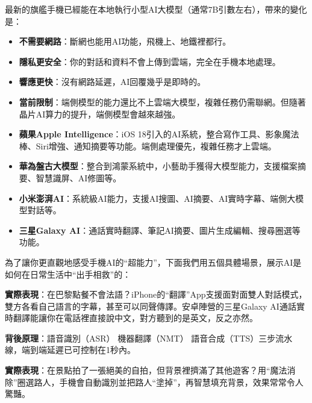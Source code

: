 
最新的旗艦手機已經能在本地執行小型AI大模型（通常7B引數左右），帶來的變化是：

\begin{itemize}
  \item \textbf{不需要網路}：斷網也能用AI功能，飛機上、地鐵裡都行。
  \item \textbf{隱私更安全}：你的對話和資料不會上傳到雲端，完全在手機本地處理。
  \item \textbf{響應更快}：沒有網路延遲，AI回覆幾乎是即時的。
  \item \textbf{當前限制}：端側模型的能力還比不上雲端大模型，複雜任務仍需聯網。但隨著晶片AI算力的提升，端側模型會越來越強。
\end{itemize}


\begin{itemize}
  \item \textbf{蘋果Apple Intelligence}：iOS 18引入的AI系統，整合寫作工具、影象魔法棒、Siri增強、通知摘要等功能。端側處理優先，複雜任務才上雲端。
  \item \textbf{華為盤古大模型}：整合到鴻蒙系統中，小藝助手獲得大模型能力，支援檔案摘要、智慧識屏、AI修圖等。
  \item \textbf{小米澎湃AI}：系統級AI能力，支援AI搜圖、AI摘要、AI實時字幕、端側大模型對話等。
  \item \textbf{三星Galaxy AI}：通話實時翻譯、筆記AI摘要、圖片生成編輯、搜尋圈選等功能。
\end{itemize}


為了讓你更直觀地感受手機AI的“超能力”，下面我們用五個具體場景，展示AI是如何在日常生活中“出手相救”的：


\textbf{實際表現}：在巴黎點餐不會法語？iPhone的“翻譯”App支援面對面雙人對話模式，雙方各看自己語言的字幕，甚至可以同聲傳譯。安卓陣營的三星Galaxy AI通話實時翻譯能讓你在電話裡直接說中文，對方聽到的是英文，反之亦然。

\textbf{背後原理}：語音識別（ASR） 機器翻譯（NMT） 語音合成（TTS）三步流水線，端到端延遲已可控制在1秒內。


\textbf{實際表現}：在景點拍了一張絕美的自拍，但背景裡擠滿了其他遊客？用“魔法消除”圈選路人，手機會自動識別並把路人“塗掉”，再智慧填充背景，效果常常令人驚豔。

